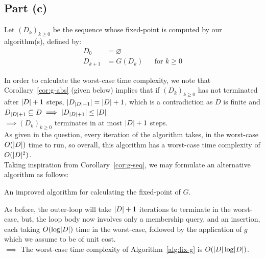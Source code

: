 \subsection{Part (c)}\label{sec:q-2-c}

Let $(D_k)_{k\geq0}$ be the sequence whose fixed-point is computed by our algorithm(s), defined by:
\begin{align*}
  D_0 & =\varnothing\\
  D_{k+1} & = G(D_k) && \text{for }k\geq0
\end{align*}

In order to calculate the worst-case time complexity, we note that Corollary~\ref{cor:g-abs} (given below) implies that if $(D_k)_{k\geq0}$ has not terminated after $\lvert D\rvert + 1$ steps, $\lvert D_{\lvert D\rvert+1}\rvert = \lvert D\rvert + 1$, which is a contradiction as $D$ is finite and $D_{\lvert D\rvert+1}\subseteq D\implies \lvert D_{\lvert D\rvert+1}\rvert\leq \lvert D\rvert$.\\[1em]

\noindent
$\implies (D_k)_{k\geq0}$ terminates in at most $\lvert D\rvert+1$ steps.\\[1em]

As given in the question, every iteration of the algorithm takes, in the worst-case $O(\lvert D\rvert)$ time to run, so overall, this algorithm has a worst-case time complexity of $O(\lvert D\rvert^2)$.\\[1em]

Taking inspiration from Corollary~\ref{cor:g-seq}, we may formulate an alternative algorithm as follows:

\begin{algorithm}
  \caption{An improved algorithm for calculating the fixed-point of $G$.}\label{alg:fix-g}
\end{algorithm}

As before, the outer-loop will take $\lvert D\rvert+1$ iterations to terminate in the worst-case, but, the loop body now involves only a membership query, and an insertion, each taking $O(\log\lvert D\rvert)$ time in the worst-case, followed by the application of $g$ which we assume to be of unit cost.\\[1em]

\noindent
$\implies$ The worst-case time complexity of Algorithm~\ref{alg:fix-g} is $O(\lvert D\rvert\log\lvert D\rvert)$.

